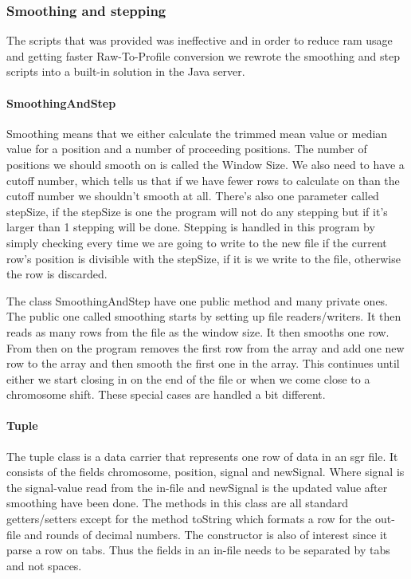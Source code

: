 \subsubsection{Smoothing and stepping}
The scripts that was provided was ineffective and in order to reduce ram usage and getting faster Raw-To-Profile conversion we rewrote the smoothing and step scripts into a built-in solution in the Java server.

\paragraph{SmoothingAndStep}
Smoothing means that we either calculate the trimmed mean value or median value for a position and a number of proceeding positions. The number of positions we should smooth on is called the Window Size. We also need to have a cutoff number, which tells us that if we have fewer rows to calculate on than the cutoff number we shouldn't smooth at all. There's also one parameter called stepSize, if the stepSize is one the program will not do any stepping but if it's larger than 1 stepping will be done. Stepping is handled in this program by simply checking every time we are going to write to the new file if the current row's position is divisible with the stepSize, if it is we write to the file, otherwise the row is discarded.

The class SmoothingAndStep have one public method and many private ones. The public one called smoothing starts by setting up file readers/writers. It then reads as many rows from the file as the window size. It then smooths one row. From then on the program removes the first row from the array and add one new row to the array and then smooth the first one in the array. This continues until either we start closing in on the end of the file or when we come close to a chromosome shift. These special cases are handled a bit different.




\paragraph{Tuple}
The tuple class is a data carrier that represents one row of data in an sgr file. It consists of the fields chromosome, position, signal and newSignal. Where signal is the signal-value read from the in-file and newSignal is the updated value after smoothing have been done.
The methods in this class are all standard getters/setters except for the method toString which formats a row for the out-file and rounds of decimal numbers. The constructor is also of interest since it parse a row on tabs. Thus the fields in an in-file needs to be separated by tabs and not spaces.


